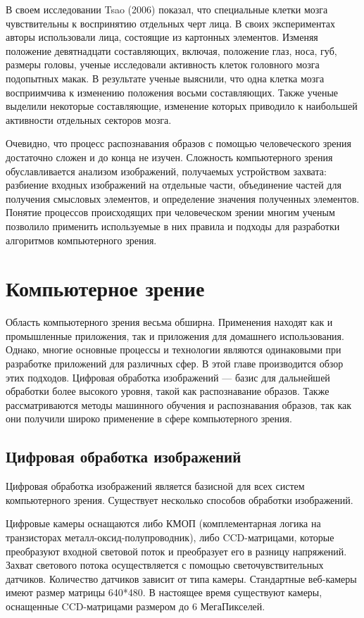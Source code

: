 В своем исследовании Tsao (2006) показал, что специальные клетки мозга чувствительны к воспринятию отдельных черт лица. В своих экспериментах авторы использовали лица, состоящие из картонных элементов. Изменяя положение девятнадцати составляющих, включая, положение глаз, носа, губ, размеры головы, ученые исследовали активность клеток головного мозга подопытных макак. В результате ученые выяснили, что одна клетка мозга восприимчива к изменению положения восьми составляющих. Также ученые выделили некоторые составляющие, изменение которых приводило к наибольшей активности отдельных секторов мозга.


Очевидно, что процесс распознавания образов с помощью человеческого зрения достаточно сложен и до конца не изучен. Сложность компьютерного зрения обуславливается анализом изображений, получаемых устройством захвата: разбиение входных изображений на отдельные части, объединение частей для получения смысловых элементов, и определение значения полученных элементов. Понятие процессов происходящих при человеческом зрении многим ученым позволило применить используемые в них правила и подходы для разработки алгоритмов компьютерного зрения.

\section{Компьютерное зрение}
Область компьютерного зрения весьма обширна. Применения находят как и промышленные приложения, так и приложения для домашнего использования. Однако, многие основные процессы и технологии являются одинаковыми при разработке приложений для различных сфер. В этой главе производится обзор этих подходов. Цифровая обработка изображений --- базис для дальнейшей обработки более высокого уровня, такой как распознавание образов. Также рассматриваются методы машинного обучения и распознавания образов, так как они получили широко применение в сфере компьютерного зрения.

\subsection{Цифровая обработка изображений}
Цифровая обработка изображений является базисной для всех систем компьютерного зрения. Существует несколько способов обработки изображений.

Цифровые камеры оснащаются либо КМОП (комплементарная логика на транзисторах металл-оксид-полупроводник), либо CCD-матрицами, которые преобразуют входной световой поток и преобразует его в разницу напряжений. Захват светового потока осуществляется с помощью светочувствительных датчиков. Количество датчиков зависит от типа камеры. Стандартные веб-камеры имеют размер матрицы 640*480. В настоящее время существуют камеры, оснащенные CCD-матрицами размером до 6 МегаПикселей.  

